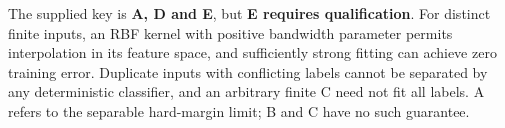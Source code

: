 The supplied key is \textbf{A, D and E}, but \textbf{E requires qualification}. For distinct finite inputs, an RBF kernel with positive bandwidth parameter permits interpolation in its feature space, and sufficiently strong fitting can achieve zero training error. Duplicate inputs with conflicting labels cannot be separated by any deterministic classifier, and an arbitrary finite C need not fit all labels. A refers to the separable hard-margin limit; B and C have no such guarantee.
